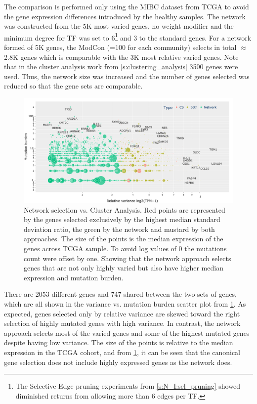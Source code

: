 The comparison is performed only using the MIBC dataset from TCGA to avoid the gene expression differences introduced by the healthy samples. The network was constructed from the 5K most varied genes, no weight modifier and the minimum degree for TF was set to 6\footnote{The Selective Edge pruning experiments from \cref{s:N_I:sel_pruning} showed diminished returns from allowing more than 6 edges per TF.} and 3 to the standard genes. For a network formed of 5K genes, the ModCon (=100 for each community) selects in total $\approx$2.8K genes which is comparable with the 3K most relative varied genes. Note that in the cluster analysis work from \cref{s:clustering_analysis} 3500 genes were used. Thus, the network size was increased and the number of genes selected was reduced so that the gene sets are comparable.

\begin{figure}[!t]    
    \centering\includegraphics[width=1.0\textwidth,keepaspectratio]{Sections/Network_I/Resources/Tum_network/ClusteringAnalysis_vs_Network_3.png}
    \caption[Gene selection: network vs cluster analysis]{Network selection vs. Cluster Analysis. Red points are represented by the genes selected exclusively by the highest median standard deviation ratio, the green by the network and mustard by both approaches. The size of the points is the median expression of the genes across TCGA sample. To avoid log values of 0 the mutations count were offset by one. Showing that the network approach selects genes that are not only highly varied but also have higher median expression and mutation burden.}
    \label{fig:N_I:network_ca_selection}
\end{figure}

There are 2053 different genes and 747 shared between the two sets of genes, which are all shown in the variance vs. mutation burden scatter plot from \cref{fig:N_I:network_ca_selection}. As expected, genes selected only by relative variance are skewed toward the right selection of highly mutated genes with high variance. In contrast, the network approach selects most of the varied genes and some of the highest mutated genes despite having low variance. The size of the points is relative to the median expression in the TCGA cohort, and from \cref{fig:N_I:network_ca_selection}, it can be seen that the canonical gene selection does not include highly expressed genes as the network does.

